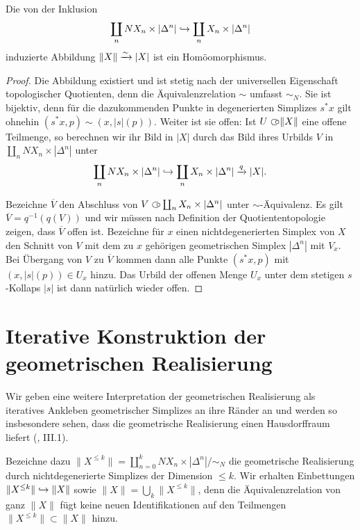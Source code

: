 \begin{satz}
  Die von der Inklusion
  \[ \coprod_n NX_n \times |\Delta^n| \hookrightarrow \coprod_n X_n \times |\Delta^n| \]
  induzierte Abbildung $\|X\| \xrightarrow[]{\sim} |X|$ ist ein Homöomorphismus.
\end{satz}
\begin{proof}
  Die Abbildung existiert und ist stetig nach der universellen
  Eigenschaft topologischer Quotienten, denn die Äquivalenzrelation
  $\sim$ umfasst $\sim_N$. Sie ist bijektiv, denn für die
  dazukommenden Punkte in degenerierten Simplizes $s^* x$ gilt ohnehin
  $(s^* x, p) \sim (x, |s|(p))$. Weiter ist sie offen: Ist $U \subset\kern-0.58em\circ
  \|X\|$ eine offene Teilmenge, so berechnen wir ihr Bild in $|X|$
  durch das Bild ihres Urbilds $V$ in $\coprod_n NX_n \times
  |\Delta^n|$ unter
  \[ \coprod_n NX_n \times |\Delta^n|
  \hookrightarrow \coprod_n X_n \times |\Delta^n| \xrightarrow{q} |X|. \]

  Bezeichne $\overline{V}$ den Abschluss von $V \subset\kern-0.58em\circ \coprod_n X_n
  \times |\Delta^n|$ unter $\sim$-Äquivalenz. Es gilt $\overline{V} =
  q^{-1}(q(V))$ und wir müssen nach Definition der Quotiententopologie
  zeigen, dass $\overline{V}$ offen ist. Bezeichne für $x$ einen
  nichtdegenerierten Simplex von $X$ den Schnitt von $V$ mit dem zu
  $x$ gehörigen geometrischen Simplex $|\Delta^n|$ mit $V_x$. Bei
  Übergang von $V$ zu $\overline{V}$ kommen dann alle Punkte $(s^* x,
  p)$ mit $(x, |s|(p)) \in U_x$ hinzu. Das Urbild der offenen Menge $U_x$
  unter dem stetigen $s$-Kollaps $|s|$ ist dann natürlich wieder
  offen.
\end{proof}

\section{Iterative Konstruktion der geometrischen Realisierung}

Wir geben eine weitere Interpretation der geometrischen Realisierung
als iteratives Ankleben geometrischer Simplizes an ihre Ränder an und
werden so insbesondere sehen, dass die geometrische Realisierung einen
Hausdorffraum liefert (\cite{Moer}, III.1).

Bezeichne dazu $\|X^{\leq k}\| = \coprod_{n = 0}^k NX_n \times
|\Delta^n| / \sim_N $ die geometrische Realisierung durch
nichtdegenerierte Simplizes der Dimension $\leq k$. Wir erhalten
Einbettungen $\|X^{\leq k}\| \hookrightarrow \|X\|$ sowie $\|X\| = \bigcup_k
\|X^{\leq k}\|$, denn die Äquivalenzrelation von ganz $\|X\|$ fügt
keine neuen Identifikationen auf den Teilmengen $\|X^{\leq k}\|
\subset \|X\|$ hinzu.

